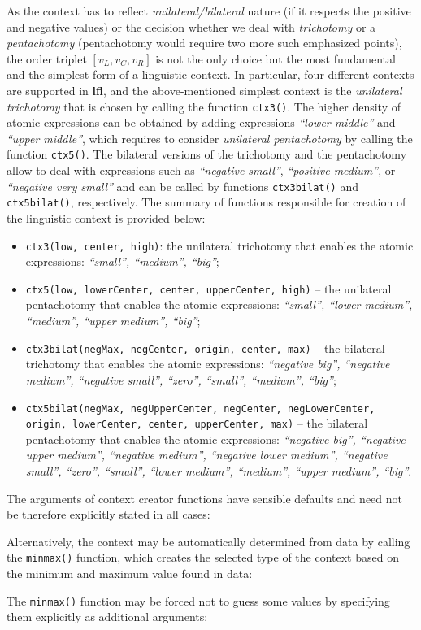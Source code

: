 \documentclass[review]{elsarticle}
\newcommand{\pkg}[1]{\textbf{#1}}
\newcommand{\code}[1]{\texttt{#1}}
\begin{document}
As the context has to reflect \emph{unilateral/bilateral} nature (if it respects the positive and negative values) or the decision whether we deal with \emph{trichotomy} or a \emph{pentachotomy} (pentachotomy would require two more such emphasized points), the order triplet $[v_L, v_C, v_R]$ is not the only choice but the most fundamental and the simplest form of a linguistic context. In particular,  four different contexts are supported in \pkg{lfl}, and the above-mentioned simplest context is the \emph{unilateral trichotomy} that is chosen by calling the function \code{ctx3()}. The higher density of atomic expressions can be obtained by adding expressions \emph{``lower middle''} and \emph{``upper middle''}, which requires to consider \emph{unilateral pentachotomy} by calling the function \code{ctx5()}. The bilateral versions of the trichotomy and the pentachotomy allow to deal with expressions such as \emph{``negative small''}, \emph{``positive medium''}, or \emph{``negative very small''} and can be called by functions  \code{ctx3bilat()} and \code{ctx5bilat()}, respectively. The summary of functions responsible for creation of the linguistic context is provided below:
%
\begin{itemize}
    \item \code{ctx3(low, center, high)}: the unilateral trichotomy that enables the atomic expressions: \emph{``small'', ``medium'', ``big''}; 
    \item \code{ctx5(low, lowerCenter, center, upperCenter, high)} -- the unilateral pentacho\-to\-my that enables the atomic expressions: \emph{``small'', ``lower medium'', ``medium'', ``upper medium'', ``big''}; 
    \item \code{ctx3bilat(negMax, negCenter, origin, center, max)} -- the bilateral trichotomy that enables the atomic expressions: \emph{``negative big'', ``negative medium'', ``negative small'', ``zero'', ``small'', ``medium'', ``big''};
    \item \code{ctx5bilat(negMax, negUpperCenter, negCenter, negLowerCenter, origin, low\-erCenter, center, upperCenter, max)} -- the bilateral pentachotomy that enables the atomic expressions: \emph{``negative big'', ``negative upper medium'', ``negative medium'', ``negative lower medium'', ``negative small'', ``zero'', ``small'', ``lower medium'', ``medium'', ``upper medium'', ``big''}.
\end{itemize}
%
The arguments of context creator functions have sensible defaults and need not be therefore explicitly stated in all cases:
%

%
Alternatively, the context may be automatically determined from data by calling the \code{minmax()} function, which creates the selected type of the context based on the minimum and maximum value found in data:
%

%
The \code{minmax()} function may be forced not to guess some values by specifying them explicitly as additional arguments:
%

\end{document}
